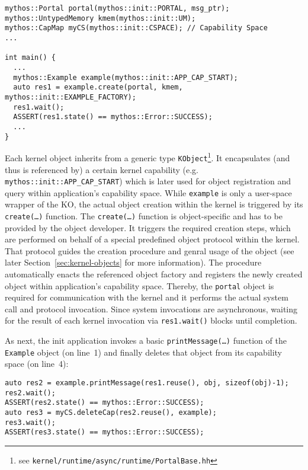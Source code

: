 \lstset{language=c++}
\begin{lstlisting}
mythos::Portal portal(mythos::init::PORTAL, msg_ptr);
mythos::UntypedMemory kmem(mythos::init::UM);
mythos::CapMap myCS(mythos::init::CSPACE); // Capability Space
...

int main() {
  ...
  mythos::Example example(mythos::init::APP_CAP_START);
  auto res1 = example.create(portal, kmem, mythos::init::EXAMPLE_FACTORY);
  res1.wait();
  ASSERT(res1.state() == mythos::Error::SUCCESS);
  ...
}
\end{lstlisting}

\noindent Each kernel object inherits from a generic type
\texttt{KObject}\footnote{see
\texttt{kernel/runtime/async/runtime/PortalBase.hh}}.
It encapsulates (and thus is referenced by) a certain kernel capability (e.g.
\texttt{mythos::init::APP\_CAP\_START}) which is later used for object
registration and query within application's capability space. While
\texttt{example} is only a user-space wrapper of the KO, the actual object
creation within the kernel is triggered by its \texttt{create(\ldots)} function.
The \texttt{create(\ldots)} function is object-specific and has to be provided
by the object developer. It triggers the required creation steps, which are
performed on behalf of a special predefined object protocol within the kernel.
That protocol guides the creation procedure and genral usage of the object (see
later Section~\ref{sec:kernel-objects} for more information). The procedure
automatically enacts the referenced object factory and registers the newly
created object within application's capability space.
Thereby, the \texttt{portal} object is required for communication with the
kernel and it performs the actual system call and protocol invocation. Since
system invocations are asynchronous, waiting for the result of each kernel
invocation via \texttt{res1.wait()} blocks until completion.

As next, the init application invokes a basic \texttt{printMessage(\ldots)}
function of the \texttt{Example} object (on line~1) and finally deletes that
object from its capability space (on line~4):

\lstset{language=c++}
\begin{lstlisting}
auto res2 = example.printMessage(res1.reuse(), obj, sizeof(obj)-1);
res2.wait();
ASSERT(res2.state() == mythos::Error::SUCCESS);
auto res3 = myCS.deleteCap(res2.reuse(), example);
res3.wait();
ASSERT(res3.state() == mythos::Error::SUCCESS);
\end{lstlisting}

